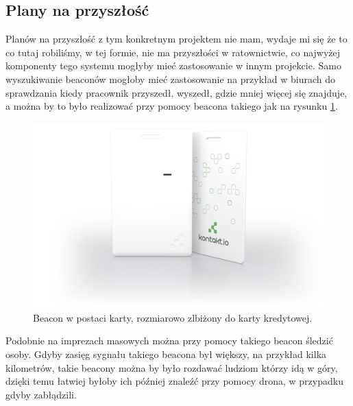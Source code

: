 \subsection{Plany na przyszłość}

Planów na przyszłość z tym konkretnym projektem nie mam, wydaje mi się że to co tutaj robiliśmy, w tej formie, nie ma przyszłości w ratownictwie, co najwyżej komponenty tego systemu mogłyby mieć zastosowanie w innym projekcie. Samo wyszukiwanie beaconów mogłoby mieć zastosowanie na przykład w biurach do sprawdzania kiedy pracownik przyszedł, wyszedł, gdzie mniej więcej się znajduje, a można by to było realizować przy pomocy beacona takiego jak na rysunku \ref{fig:beaconcard}.

\begin{figure}[!th]
    \centering
    \includegraphics[width=15cm]{zalaczniki/obrazy/beacon_card.png}
    \caption{Beacon w postaci karty, rozmiarowo zlbiżony do karty kredytowej.}
    \label{fig:beaconcard}
\end{figure}

Podobnie na imprezach masowych można przy pomocy takiego beacon śledzić osoby. Gdyby zasięg sygnału takiego beacona był większy, na przykład kilka kilometrów, takie beacony można by było rozdawać ludziom którzy idą w góry, dzięki temu łatwiej byłoby ich później znaleźć przy pomocy drona, w przypadku gdyby zabłądzili.
